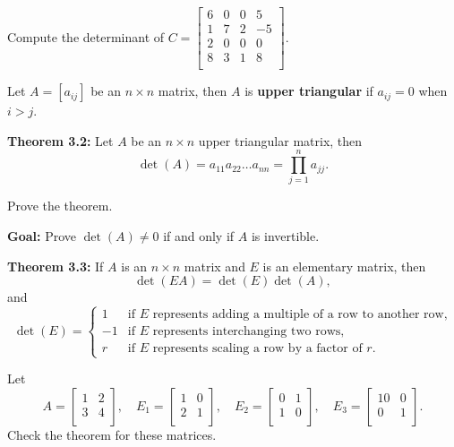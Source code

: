 \begin{enumerate}

\Problem Compute the determinant of 
$C=\begin{bmatrix}
6 & 0 & 0 & 5\\
1 & 7 & 2 & -5\\
2 & 0 & 0 & 0\\
8 & 3 & 1 & 8\\
\end{bmatrix}$.

\vfill

\begin{defn} Let $A=[a_{ij}]$ be an $n\times n$ matrix, then $A$ is {\bf upper triangular} if $a_{ij}=0$ when $i>j$.
\end{defn}

{\bf Theorem 3.2:} Let $A$ be an $n\times n$ upper triangular matrix, then $$\operatorname{det}(A)= a_{11}a_{22}\dots a_{nn} = \prod_{j=1}^n a_{jj}.$$

\Problem Prove the theorem.

\vfill
\vfill


\newpage

{\bf Goal:} Prove $\operatorname{det}(A)\neq 0$ if and only if $A$ is invertible.

{\bf Theorem 3.3:} If $A$ is an $n\times n$ matrix and $E$ is an elementary matrix, then $$\operatorname{det}(EA)=\operatorname{det}(E) \operatorname{det}(A),$$ and 
$$\operatorname{det}(E)=\begin{cases}
1 & \text{if $E$ represents adding a multiple of a row to another row,}\\
-1 & \text{if $E$ represents interchanging two rows,}\\
r & \text{if $E$ represents scaling a row by a factor of $r$.}
\end{cases}$$

\Problem Let $$A=\begin{bmatrix} 1 & 2\\ 3 & 4\\ \end{bmatrix}, \quad E_1=\begin{bmatrix} 1 & 0\\ 2 & 1\\ \end{bmatrix}, \quad E_2=\begin{bmatrix} 0 & 1\\ 1 & 0\\ \end{bmatrix}, \quad E_3=\begin{bmatrix} 10 & 0\\ 0 & 1\\ \end{bmatrix}.$$ Check the theorem for these matrices.


\end{enumerate}
